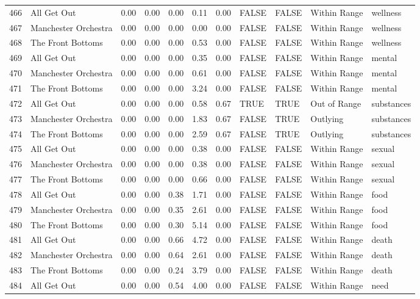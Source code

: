 \begin{table}[ht]
\begin{tabular}{rlrrrrrllll}
  466 & All Get Out & 0.00 & 0.00 & 0.00 & 0.11 & 0.00 & FALSE & FALSE & Within Range & wellness \\ 
  467 & Manchester Orchestra & 0.00 & 0.00 & 0.00 & 0.00 & 0.00 & FALSE & FALSE & Within Range & wellness \\ 
  468 & The Front Bottoms & 0.00 & 0.00 & 0.00 & 0.53 & 0.00 & FALSE & FALSE & Within Range & wellness \\ 
  469 & All Get Out & 0.00 & 0.00 & 0.00 & 0.35 & 0.00 & FALSE & FALSE & Within Range & mental \\ 
  470 & Manchester Orchestra & 0.00 & 0.00 & 0.00 & 0.61 & 0.00 & FALSE & FALSE & Within Range & mental \\ 
  471 & The Front Bottoms & 0.00 & 0.00 & 0.00 & 3.24 & 0.00 & FALSE & FALSE & Within Range & mental \\ 
  472 & All Get Out & 0.00 & 0.00 & 0.00 & 0.58 & 0.67 & TRUE & TRUE & Out of Range & substances \\ 
  473 & Manchester Orchestra & 0.00 & 0.00 & 0.00 & 1.83 & 0.67 & FALSE & TRUE & Outlying & substances \\ 
  474 & The Front Bottoms & 0.00 & 0.00 & 0.00 & 2.59 & 0.67 & FALSE & TRUE & Outlying & substances \\ 
  475 & All Get Out & 0.00 & 0.00 & 0.00 & 0.38 & 0.00 & FALSE & FALSE & Within Range & sexual \\ 
  476 & Manchester Orchestra & 0.00 & 0.00 & 0.00 & 0.38 & 0.00 & FALSE & FALSE & Within Range & sexual \\ 
  477 & The Front Bottoms & 0.00 & 0.00 & 0.00 & 0.66 & 0.00 & FALSE & FALSE & Within Range & sexual \\ 
  478 & All Get Out & 0.00 & 0.00 & 0.38 & 1.71 & 0.00 & FALSE & FALSE & Within Range & food \\ 
  479 & Manchester Orchestra & 0.00 & 0.00 & 0.35 & 2.61 & 0.00 & FALSE & FALSE & Within Range & food \\ 
  480 & The Front Bottoms & 0.00 & 0.00 & 0.30 & 5.14 & 0.00 & FALSE & FALSE & Within Range & food \\ 
  481 & All Get Out & 0.00 & 0.00 & 0.66 & 4.72 & 0.00 & FALSE & FALSE & Within Range & death \\ 
  482 & Manchester Orchestra & 0.00 & 0.00 & 0.64 & 2.61 & 0.00 & FALSE & FALSE & Within Range & death \\ 
  483 & The Front Bottoms & 0.00 & 0.00 & 0.24 & 3.79 & 0.00 & FALSE & FALSE & Within Range & death \\ 
  484 & All Get Out & 0.00 & 0.00 & 0.54 & 4.00 & 0.00 & FALSE & FALSE & Within Range & need \\ 

\end{tabular}
\end{table}
